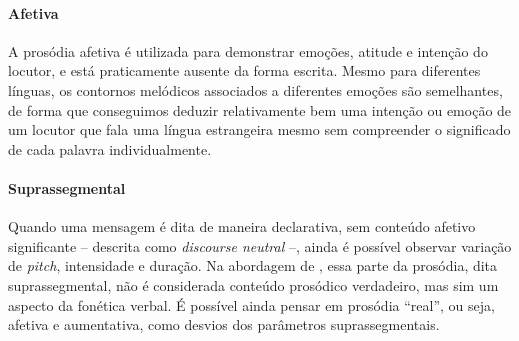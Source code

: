 \paragraph{Afetiva} A prosódia afetiva é utilizada para demonstrar emoções,
atitude e intenção do locutor, e está praticamente ausente da forma escrita.
Mesmo para diferentes línguas, os contornos melódicos associados a diferentes
emoções são semelhantes, de forma que conseguimos deduzir relativamente bem uma
intenção ou emoção de um locutor que fala uma língua estrangeira mesmo sem
compreender o significado de cada palavra individualmente.

\paragraph{Suprassegmental} Quando uma mensagem é dita de maneira declarativa,
sem conteúdo afetivo significante -- descrita como \emph{discourse neutral} --,
ainda é possível observar variação de \emph{pitch}, intensidade e duração. Na
abordagem de , essa parte da prosódia, dita
suprassegmental, não é considerada conteúdo prosódico verdadeiro, mas sim um
aspecto da fonética verbal. É possível ainda pensar em prosódia ``real'', ou
seja, afetiva e aumentativa, como desvios dos parâmetros suprassegmentais.

